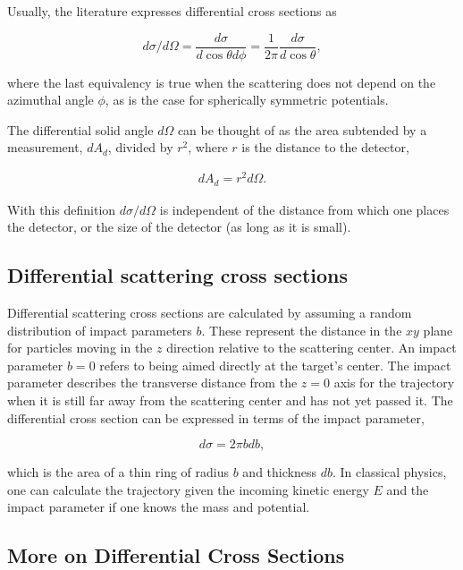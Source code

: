 \documentclass[%
oneside,                 %
final,                   %
10pt]{article}
\begin{document}
Usually, the literature expresses differential cross sections as

\begin{equation}
d\sigma/d\Omega=\frac{d\sigma}{d\cos\theta d\phi}=\frac{1}{2\pi}\frac{d\sigma}{d\cos\theta},
\end{equation}

where the last equivalency is true when the scattering does not depend
on the azimuthal angle $\phi$, as is the case for spherically
symmetric potentials.

The differential solid angle $d\Omega$ can be thought of as the area
subtended by a measurement, $dA_d$, divided by $r^2$, where $r$ is the
distance to the detector,

\begin{eqnarray}
dA_d=r^2 d\Omega.
\end{eqnarray}

With this definition $d\sigma/d\Omega$ is independent of the distance
from which one places the detector, or the size of the detector (as
long as it is small).

\subsection{Differential scattering cross sections}

Differential scattering cross sections are calculated by assuming a
random distribution of impact parameters $b$. These represent the
distance in the $xy$ plane for particles moving in the $z$ direction
relative to the scattering center. An impact parameter $b=0$ refers to
being aimed directly at the target's center. The impact parameter
describes the transverse distance from the $z=0$ axis for the
trajectory when it is still far away from the scattering center and
has not yet passed it. The differential cross section can be expressed
in terms of the impact parameter,

\begin{equation}
d\sigma=2\pi bdb,
\end{equation}

which is the area of a thin ring of radius $b$ and thickness $db$. In
classical physics, one can calculate the trajectory given the incoming
kinetic energy $E$ and the impact parameter if one knows the mass and
potential.

\subsection{More on Differential  Cross Sections}
\end{document}
